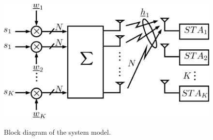 
\begin{figure}
    \includegraphics[width=12cm]{figs/system_desc.png}\\
    \caption{Block diagram of the system model.}
    \label{fig:sys_bd}
\end{figure}
